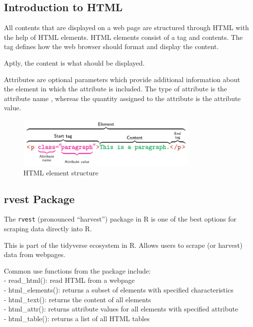 \documentclass[
  11pt,
]{book}
\theoremstyle{definition}
\theoremstyle{definition}
\theoremstyle{definition}
\theoremstyle{definition}
\theoremstyle{remark}
\begin{document}
\hypertarget{introduction-to-html}{%
\subsection{Introduction to HTML}\label{introduction-to-html}}

All contents that are displayed on a web page are structured through HTML with the help of HTML
elements. HTML elements consist of a tag and contents. The tag defines how the web browser should format and display the content.

Aptly, the content is what should be displayed.

Attributes are optional parameters which provide additional information about the element in which the attribute is included. The type of attribute is the attribute name , whereas the quantity assigned to the attribute is the attribute value.

\begin{figure}
\centering
\includegraphics[width=0.8\textwidth,height=\textheight]{images/html.png}
\caption{HTML element structure}
\end{figure}

\newpage

\hypertarget{rvest-package}{%
\subsection{rvest Package}\label{rvest-package}}

The \texttt{rvest} (pronounced ``harvest'') package in R is one of the best options for scraping data directly into R.

This is part of the tidyverse ecosystem in R. Allows users to scrape (or harvest) data from webpages.

Common use functions from the package include:\\
- read\_html(): read HTML from a webpage\\
- html\_elements(): returns a subset of elements with specified characteristics\\
- html\_text(): returns the content of all elements\\
- html\_attr(): returns attribute values for all elements with specified attribute\\
- html\_table(): returns a list of all HTML tables
\end{document}
